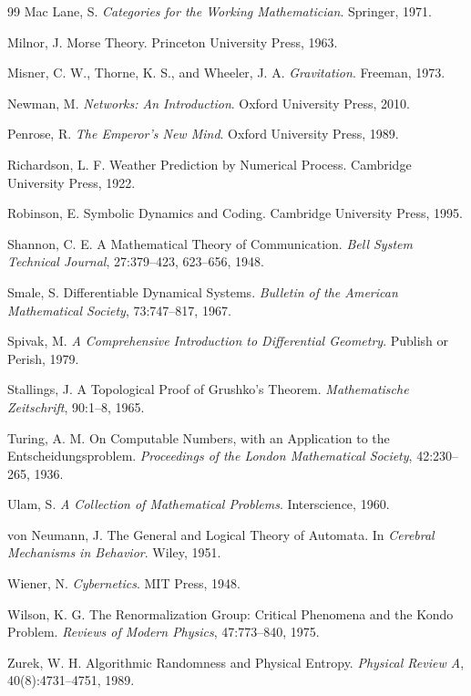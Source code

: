 \documentclass[12pt,oneside]{book}
\theoremstyle{plain} \newtheorem{theorem}{Theorem}[chapter] \newtheorem{lemma}[theorem]{Lemma} \newtheorem{proposition}[theorem]{Proposition} \newtheorem{corollary}[theorem]{Corollary}
\theoremstyle{definition} \newtheorem{definition}[theorem]{Definition} \newtheorem{axiom}[theorem]{Axiom} \newtheorem{construction}[theorem]{Construction}
\theoremstyle{remark} \newtheorem{remark}[theorem]{Remark} \newtheorem{example}[theorem]{Example}
\begin{document}
\begin{thebibliography}{99}
Mac Lane, S.
\textit{Categories for the Working Mathematician}.
Springer, 1971.

Milnor, J.
Morse Theory.
Princeton University Press, 1963.

Misner, C. W., Thorne, K. S., and Wheeler, J. A.
\textit{Gravitation}.
Freeman, 1973.

Newman, M.
\textit{Networks: An Introduction}.
Oxford University Press, 2010.

Penrose, R.
\textit{The Emperor's New Mind}.
Oxford University Press, 1989.

Richardson, L. F.
Weather Prediction by Numerical Process.
Cambridge University Press, 1922.

Robinson, E.
Symbolic Dynamics and Coding.
Cambridge University Press, 1995.

Shannon, C. E.
A Mathematical Theory of Communication.
\textit{Bell System Technical Journal},
27:379--423, 623--656, 1948.

Smale, S.
Differentiable Dynamical Systems.
\textit{Bulletin of the American Mathematical Society},
73:747--817, 1967.

Spivak, M.
\textit{A Comprehensive Introduction to Differential Geometry}.
Publish or Perish, 1979.

Stallings, J.
A Topological Proof of Grushko's Theorem.
\textit{Mathematische Zeitschrift},
90:1--8, 1965.

Turing, A. M.
On Computable Numbers, with an Application to the Entscheidungsproblem.
\textit{Proceedings of the London Mathematical Society},
42:230--265, 1936.

Ulam, S.
\textit{A Collection of Mathematical Problems}.
Interscience, 1960.

von Neumann, J.
The General and Logical Theory of Automata.
In \textit{Cerebral Mechanisms in Behavior}.
Wiley, 1951.

Wiener, N.
\textit{Cybernetics}.
MIT Press, 1948.

Wilson, K. G.
The Renormalization Group:
Critical Phenomena and the Kondo Problem.
\textit{Reviews of Modern Physics},
47:773--840, 1975.

Zurek, W. H.
Algorithmic Randomness and Physical Entropy.
\textit{Physical Review A},
40(8):4731--4751, 1989.

\end{thebibliography}
\end{document}
